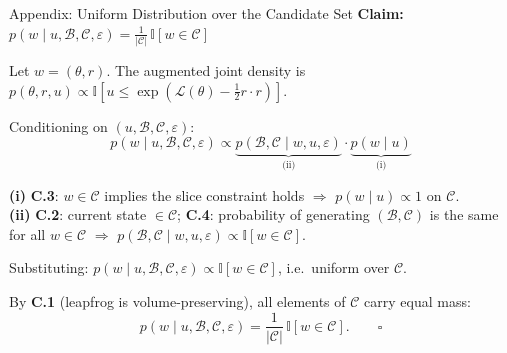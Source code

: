 \documentclass{beamer}
\begin{document}
\begin{frame}{Appendix: Uniform Distribution over the Candidate Set}
    \small
    \textbf{Claim:} $p(w \mid u,\mathcal{B},\mathcal{C},\varepsilon) = \tfrac{1}{|\mathcal{C}|}\,\mathbb{I}[w\in\mathcal{C}]$

    Let $w=(\theta,r)$. The augmented joint density is
    $p(\theta,r,u) \propto \mathbb{I}\!\left[u \le \exp\!\left(\mathcal{L}(\theta)-\tfrac12 r\cdot r\right)\right].$

    Conditioning on $(u,\mathcal{B},\mathcal{C},\varepsilon)$:
    \begin{equation*}
      p(w \mid u,\mathcal{B},\mathcal{C},\varepsilon) \propto
      \underbrace{p(\mathcal{B},\mathcal{C}\mid w,u,\varepsilon)}_{\text{(ii)}} \cdot
      \underbrace{p(w\mid u)}_{\text{(i)}}
    \end{equation*}

    \begin{tcolorbox}[colback=CSlight, colframe=CSgrey, fonttitle=\bfseries\footnotesize,
      boxrule=0.8pt, arc=3pt, left=4pt, right=4pt, top=3pt, bottom=3pt]
      \footnotesize
      \textbf{(i)} \textbf{C.3}: $w\in\mathcal{C}$ implies the slice constraint holds $\Rightarrow$
      $p(w\mid u) \propto 1$ on $\mathcal{C}$.\\[3pt]
      \textbf{(ii)} \textbf{C.2}: current state $\in\mathcal{C}$;\quad
      \textbf{C.4}: probability of generating $(\mathcal{B},\mathcal{C})$ is the same for all $w\in\mathcal{C}$ $\Rightarrow$ $p(\mathcal{B},\mathcal{C}\mid w,u,\varepsilon) \propto \mathbb{I}[w\in\mathcal{C}]$.
    \end{tcolorbox}

    Substituting: $p(w \mid u,\mathcal{B},\mathcal{C},\varepsilon) \propto \mathbb{I}[w\in\mathcal{C}]$, i.e.\ uniform over $\mathcal{C}$.

    By \textbf{C.1} (leapfrog is volume-preserving), all elements of $\mathcal{C}$ carry equal mass:
    \[
      p(w \mid u,\mathcal{B},\mathcal{C},\varepsilon) = \frac{1}{|\mathcal{C}|}\,\mathbb{I}[w\in\mathcal{C}]. \qquad \square
    \]
\end{frame}
\end{document}
